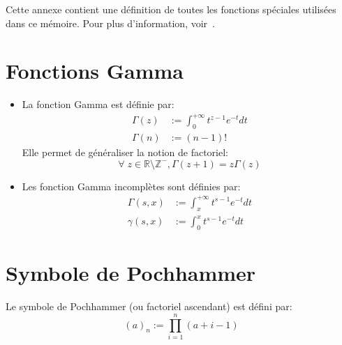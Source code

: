 {}



\label{special_functions}
Cette annexe contient une définition de toutes les fonctions spéciales utilisées dans ce mémoire. Pour plus d'information, voir~\cite{NIST:DLMF}.
\section*{Fonctions Gamma}
\begin{itemize}
    \item La fonction Gamma est définie par:
    \[
        \begin{aligned}
            \Gamma(z)&:=\int_0^{+\infty}t^{z-1}e^{-t}dt \\
            \Gamma(n)&:=(n-1)!
        \end{aligned}
    \]
    Elle permet de généraliser la notion de factoriel:
    \[
    \forall\;z\in\mathds{R}\setminus\mathds{Z}^-,\Gamma(z+1)=z\Gamma(z)
    \]
    \item Les fonction Gamma incomplètes sont définies par:
    \[
    \begin{aligned}
        \Gamma(s,x)&:=\int_x^{+\infty}t^{s-1}e^{-t}dt \\
        \gamma(s,x)&:=\int_0^x t^{s-1}e^{-t}dt
    \end{aligned}
    \] 
\end{itemize}
\section*{Symbole de Pochhammer}
Le symbole de Pochhammer (ou factoriel ascendant) est défini par:
\[
{(a)}_n:=\prod_{i=1}^n (a+i-1)
\]

